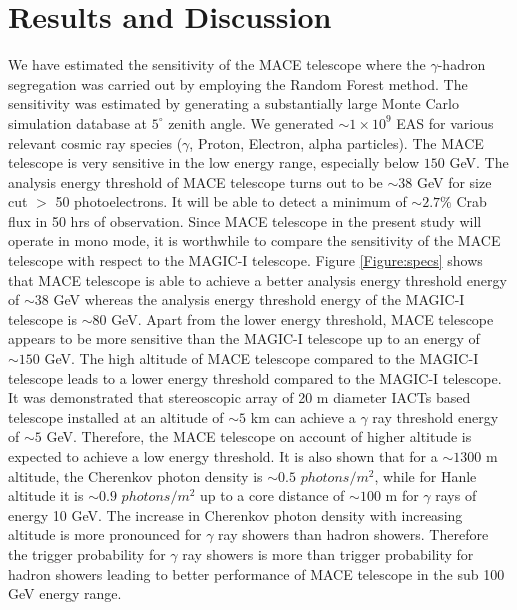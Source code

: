 \documentclass[preprint,12pt]{elsarticle}
\begin{document}
\section{Results and Discussion}
We have estimated the sensitivity of the MACE telescope where the $\gamma$-hadron segregation was carried out by 
employing the Random Forest method. The sensitivity was estimated by generating a substantially 
large  Monte Carlo simulation database at $5 ^{\circ}$ zenith angle. We generated $\sim 1 \times 10^9$ EAS for various 
relevant cosmic ray species ($\gamma$, Proton, Electron, alpha particles). The MACE 
telescope is very sensitive in the low energy range, especially below $150$ GeV. The analysis energy threshold of 
MACE telescope turns out to be $\sim 38$ GeV for size cut $>$ 50 photoelectrons. 
It will be able to detect a minimum of $\sim 2.7 \%$ Crab flux in 50 hrs of observation. 
Since MACE telescope in 
the present study will operate in mono mode, it is worthwhile to compare the sensitivity of the MACE telescope with respect to the MAGIC-I telescope. %
Figure \ref{Figure:specs} shows that MACE telescope is able to achieve a better analysis energy threshold energy of $\sim 38$ GeV whereas 
the analysis energy threshold energy of the MAGIC-I telescope is $\sim 80$ GeV. 
Apart from the lower energy threshold, MACE telescope appears to be more sensitive than the MAGIC-I telescope up to an energy of $\sim 150$ GeV. 
The high altitude of MACE telescope compared to the MAGIC-I telescope leads to a lower energy threshold compared to the MAGIC-I telescope. It was demonstrated 
\cite{konopelko} that stereoscopic array of 20 m diameter IACTs based telescope installed at an altitude of  $\sim 5$ km can achieve a $\gamma$ ray threshold energy of 
$\sim 5$ GeV. Therefore, the MACE telescope on account of higher altitude is expected to achieve a low energy threshold.  It is also shown \cite{chinmayB} 
that for a $\sim 1300$ m altitude, the Cherenkov photon density is $\sim 0.5$ $photons/m^2$, while for Hanle altitude it is $\sim 0.9$ $photons/m^2$ 
up to a core distance of $\sim 100$ m for $\gamma$ rays of energy 10 GeV.  The increase in Cherenkov photon density with increasing altitude is more 
pronounced for $\gamma$ ray showers than hadron showers. Therefore the trigger probability 
for $\gamma$ ray showers is more than trigger probability for hadron showers leading to better performance of MACE telescope in the sub 100 GeV energy range. 
\end{document}
